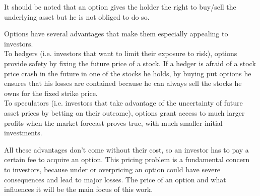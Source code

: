 \documentclass[a4paper,prd,twocolumn,nofootinbib,superscriptaddress,floatfix]{revtex4}
\begin{document}
It should be noted that an option gives the holder the right to buy/sell the underlying asset but he is not obliged to do so.

Options have several advantages that make them especially appealing to investors.\\
To hedgers (i.e. investors that want to limit their exposure to risk), options provide safety by fixing the future price of a stock. If a hedger is afraid of a stock price crash in the future in one of the stocks he holds, by buying put options he ensures that his losses are contained because he can always sell the stocks he owns for the fixed strike price.\\
To speculators (i.e. investors that take advantage of the uncertainty of future asset prices by betting on their outcome), options grant access to much larger profits when the market forecast proves true, with much smaller initial investments.

All these advantages don't come without their cost, so an investor has to pay a certain fee to acquire an option. This pricing problem is a fundamental concern to investors, because under or overpricing an option could have severe consequences and lead to major losses.
The price of an option and what influences it will be the main focus of this work.
\end{document}
